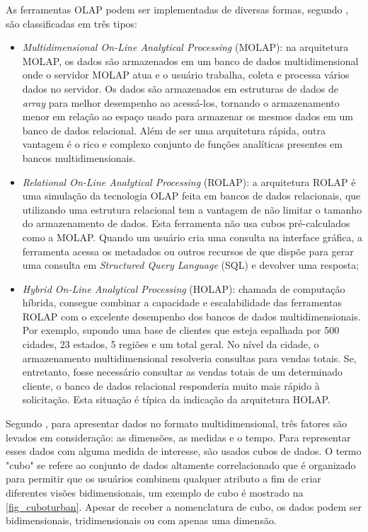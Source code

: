 As ferramentas OLAP podem ser implementadas de diversas formas, segundo , são classificadas em três tipos:
\begin{itemize}
    \item \textit{Multidimensional On-Line Analytical Processing} (MOLAP): na arquitetura MOLAP, os dados são armazenados em um banco de dados multidimensional onde o servidor MOLAP atua e o usuário trabalha, coleta e processa vários dados no servidor. Os dados são armazenados em estruturas de dados de \textit{array} para melhor desempenho ao acessá-los, tornando o armazenamento menor em relação ao espaço usado para armazenar os mesmos dados em um banco de dados relacional. Além de ser uma arquitetura rápida, outra vantagem é o rico e complexo conjunto de funções analíticas presentes em bancos multidimensionais.
    \item \textit{Relational On-Line Analytical Processing} (ROLAP): a arquitetura ROLAP é uma simulação da tecnologia OLAP feita em bancos de dados relacionais, que utilizando uma estrutura relacional tem a vantagem de não limitar o tamanho do armazenamento de dados. Esta ferramenta não usa cubos pré-calculados como a MOLAP. Quando um usuário cria uma consulta na interface gráfica, a ferramenta acessa os metadados ou outros recursos de que dispõe para gerar uma consulta em \textit{Structured Query Language} (SQL) e devolver uma resposta;
    \item \textit{Hybrid On-Line Analytical Processing} (HOLAP): chamada de computação híbrida, consegue combinar a capacidade e escalabilidade das ferramentas ROLAP com o excelente desempenho dos bancos de dados multidimensionais. Por exemplo, supondo uma base de clientes que esteja espalhada por 500 cidades, 23 estados, 5 regiões e um total geral. No nível da cidade, o armazenamento multidimensional resolveria consultas para vendas totais. Se, entretanto, fosse necessário consultar as vendas totais de um determinado cliente, o banco de dados relacional responderia muito mais rápido à solicitação. Esta situação é típica da indicação da arquitetura HOLAP.
\end{itemize}

Segundo , para apresentar dados no formato multidimensional, três fatores são levados em consideração: as dimensões, as medidas e o tempo. Para representar esses dados com alguma medida de interesse, são usados cubos de dados. O termo "cubo" se refere ao conjunto de dados altamente correlacionado que é organizado para permitir que os usuários combinem qualquer atributo a fim de criar diferentes visões bidimensionais, um exemplo de cubo é mostrado na \autoref{fig_cuboturban}. Apesar de receber a nomenclatura de cubo, os dados podem ser bidimensionais, tridimensionais ou com apenas uma dimensão.

